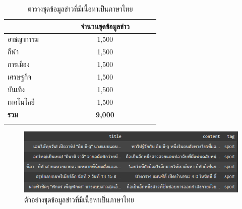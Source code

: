 \documentclass[12pt,oneside,openright,a4paper]{cpe-thai-project}
\begin{document}
      \begin{longtable}[!ht]{p{0.15\linewidth}m{0.45\linewidth}}
        \caption{ตารางชุดข้อมูลข่าวที่มีเนื้อหาเป็นภาษาไทย}
        \label{tbl:new_th}\\
        \hhline{==}
        \multicolumn{1}{c}{\textbf{หมวดหมู่}} & \multicolumn{1}{c}{\textbf{จำนวนชุดข้อมูลข่าว}} \\ \hline
        \endhead
        อาชญากรรม                              & \multicolumn{1}{c}{1,500}                        \\ %
        กีฬา                                   & \multicolumn{1}{c}{1,500}                         \\ %
        การเมือง                               & \multicolumn{1}{c}{1,500}                          \\ %
        เศรษฐกิจ                                 & \multicolumn{1}{c}{1,500}                          \\ %
        บันเทิง                                & \multicolumn{1}{c}{1,500}                          \\ %
        เทคโนโลยี                              & \multicolumn{1}{c}{1,500}                          \\ \hline
        \textbf{รวม}                           & \multicolumn{1}{c}{\textbf{9,000}}                        \\ \hhline{==}
      \end{longtable}

      \begin{figure}[!ht]\centering
        \includegraphics[width=13cm]{./img/news_th.png}
        \caption{ตัวอย่างชุดข้อมูลข่าวที่มีเนื้อหาเป็นภาษาไทย}\label{fig:new_th}
      \end{figure}
\end{document}
